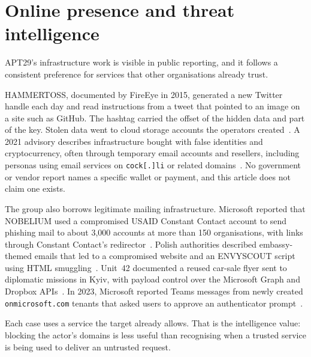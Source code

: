 \section{Online presence and threat intelligence}
\label{sec:online}

APT29's infrastructure work is visible in public reporting, and it follows a consistent preference for services that other organisations already trust.

HAMMERTOSS, documented by FireEye in 2015, generated a new Twitter handle each day and read instructions from a tweet that pointed to an image on a site such as GitHub. The hashtag carried the offset of the hidden data and part of the key. Stolen data went to cloud storage accounts the operators created~\cite{fireeye-hammertoss}. A 2021 advisory describes infrastructure bought with false identities and cryptocurrency, often through temporary email accounts and resellers, including personas using email services on \texttt{cock[.]li} or related domains~\cite{aa21-116a}. No government or vendor report names a specific wallet or payment, and this article does not claim one exists.

The group also borrows legitimate mailing infrastructure. Microsoft reported that NOBELIUM used a compromised USAID Constant Contact account to send phishing mail to about 3,000 accounts at more than 150 organisations, with links through Constant Contact's redirector~\cite{ms-nobelium}. Polish authorities described embassy-themed emails that led to a compromised website and an ENVYSCOUT script using HTML smuggling~\cite{skw-certpolska}. Unit~42 documented a reused car-sale flyer sent to diplomatic missions in Kyiv, with payload control over the Microsoft Graph and Dropbox APIs~\cite{unit42}. In 2023, Microsoft reported Teams messages from newly created \texttt{onmicrosoft.com} tenants that asked users to approve an authenticator prompt~\cite{ms-teams}.

Each case uses a service the target already allows. That is the intelligence value: blocking the actor's domains is less useful than recognising when a trusted service is being used to deliver an untrusted request.
